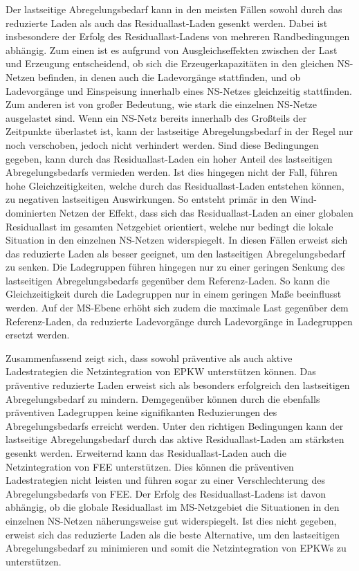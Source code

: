 Der lastseitige Abregelungsbedarf kann in den meisten Fällen sowohl durch das reduzierte Laden als auch das Residuallast-Laden gesenkt werden.
Dabei ist insbesondere der Erfolg des Residuallast-Ladens von mehreren Randbedingungen abhängig.
Zum einen ist es aufgrund von Ausgleichseffekten zwischen der Last und Erzeugung entscheidend, ob sich die Erzeugerkapazitäten in den gleichen \gls{NS}-Netzen befinden, in denen auch die Ladevorgänge stattfinden, und ob Ladevorgänge und Einspeisung innerhalb eines \gls{NS}-Netzes gleichzeitig stattfinden.
Zum anderen ist von großer Bedeutung, wie stark die einzelnen \gls{NS}-Netze ausgelastet sind.
Wenn ein \gls{NS}-Netz bereits innerhalb des Großteils der Zeitpunkte überlastet ist, kann der lastseitige Abregelungsbedarf in der Regel nur noch verschoben, jedoch nicht verhindert werden.
Sind diese Bedingungen gegeben, kann durch das Residuallast-Laden ein hoher Anteil des lastseitigen Abregelungsbedarfs vermieden werden.
Ist dies hingegen nicht der Fall, führen hohe Gleichzeitigkeiten, welche durch das Residuallast-Laden entstehen können, zu negativen lastseitigen Auswirkungen.
So entsteht primär in den Wind-dominierten Netzen der Effekt, dass sich das Residuallast-Laden an einer globalen Residuallast im gesamten Netzgebiet orientiert, welche nur bedingt die lokale Situation in den einzelnen \gls{NS}-Netzen widerspiegelt.
In diesen Fällen erweist sich das reduzierte Laden als besser geeignet, um den lastseitigen Abregelungsbedarf zu senken.
Die Ladegruppen führen hingegen nur zu einer geringen Senkung des lastseitigen Abregelungsbedarfs gegenüber dem Referenz-Laden.
So kann die Gleichzeitigkeit durch die Ladegruppen nur in einem geringen Maße beeinflusst werden.
Auf der \gls{MS}-Ebene erhöht sich zudem die maximale Last gegenüber dem Referenz-Laden, da reduzierte Ladevorgänge durch Ladevorgänge in Ladegruppen ersetzt werden.\medskip

Zusammenfassend zeigt sich, dass sowohl präventive als auch aktive Ladestrategien die Netzintegration von \gls{EPKW} unterstützen können.
Das präventive reduzierte Laden erweist sich als besonders erfolgreich den lastseitigen Abregelungsbedarf zu mindern.
Demgegenüber können durch die ebenfalls präventiven Ladegruppen keine signifikanten Reduzierungen des Abregelungsbedarfs erreicht werden.
Unter den richtigen Bedingungen kann der lastseitige Abregelungsbedarf durch das aktive Residuallast-Laden am stärksten gesenkt werden.
Erweiternd kann das Residuallast-Laden auch die Netzintegration von \gls{FEE} unterstützen.
Dies können die präventiven Ladestrategien nicht leisten und führen sogar zu einer Verschlechterung des Abregelungsbedarfs von \gls{FEE}.
Der Erfolg des Residuallast-Ladens ist davon abhängig, ob die globale Residuallast im \gls{MS}-Netzgebiet die Situationen in den einzelnen \gls{NS}-Netzen näherungsweise gut widerspiegelt.
Ist dies nicht gegeben, erweist sich das reduzierte Laden als die beste Alternative, um den lastseitigen Abregelungsbedarf zu minimieren und somit die Netzintegration von \glspl{EPKW} zu unterstützen.\medskip

